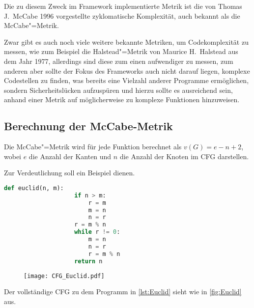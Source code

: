         Die zu diesem Zweck im Framework implementierte Metrik ist die von Thomas J.\ McCabe 1996 vorgestellte zyklomatische Komplexität,
        auch bekannt als die McCabe"=Metrik.

        Zwar gibt es auch noch viele weitere bekannte Metriken,
        um Codekomplexität zu messen,
        wie zum Beispiel die Halstead"=Metrik von Maurice H.\ Halstead aus dem Jahr 1977,
        allerdings sind diese zum einen aufwendiger zu messen,
        zum anderen aber sollte der Fokus des Frameworks auch nicht darauf liegen,
        komplexe Codestellen zu finden,
        was bereits eine Vielzahl anderer Programme ermöglichen,
        sondern Sicherheitslücken aufzuspüren und
        hierzu sollte es ausreichend sein,
        anhand einer Metrik auf möglicherweise zu komplexe Funktionen hinzuweisen.

        \subsection{Berechnung der McCabe-Metrik}\label{Berechnung der McCabe-Metrik}
            Die McCabe"=Metrik wird für jede Funktion berechnet als
            \( v(G) = e - n + 2 \),
            wobei
            \( e \) die Anzahl der Kanten und
            \( n \) die Anzahl der Knoten im
            \gls{CFG} darstellen.

            Zur Verdeutlichung soll ein Beispiel dienen.

            \begin{lstlisting}[caption={Der einfache euklidische Algorithmus in Python}, label={lst:Euclid}, gobble=16, language=python]
                def euclid(n, m):
                    if n > m:
                        r = m
                        m = n
                        n = r
                    r = m % n
                    while r != 0:
                        m = n
                        n = r
                        r = m % n
                    return n
            \end{lstlisting}

            \begin{figure}[htp]
                \centering%
                \texttt{[image: CFG\_Euclid.pdf]}
                \label{fig:Euclid}
            \end{figure}

            Der vollständige
            \gls{CFG} zu dem Programm in
            \vref{lst:Euclid} sieht wie in
            \vref{fig:Euclid} aus.

